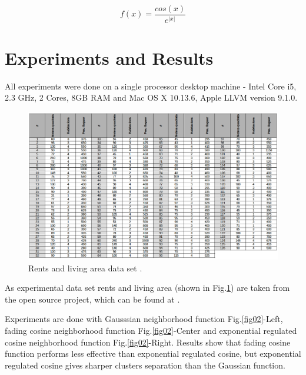 \documentclass[runningheads]{llncs}
\begin{document}
\begin{equation} \label{equ02}
f(x) = \frac{cos(x)}{e^{|x|}}
\end{equation}

\section{Experiments and Results}

All experiments were done on a single processor desktop machine - Intel Core i5, 2.3 GHz, 2 Cores, 8GB RAM and Mac OS X 10.13.6, Apple LLVM version 9.1.0.

\begin{figure}
\includegraphics[width=1.0\textwidth]{fig03.png}
\centering
\caption{Rents and living area data set \cite{garriga01}.} \label{fig03}
\end{figure}
\FloatBarrier

As experimental data set rents and living area (shown in Fig.\ref{fig03}) are taken from the open source project, which can be found at \cite{garriga01}. 

Experiments are done with Gausssian neighborhood function Fig.\ref{fig02}-Left, fading cosine neighborhood function Fig.\ref{fig02}-Center and exponential regulated cosine neighborhood function Fig.\ref{fig02}-Right. Results show that fading cosine function performs less effective than exponential regulated cosine, but exponential regulated cosine gives sharper clusters separation than the Gaussian function.
\end{document}
